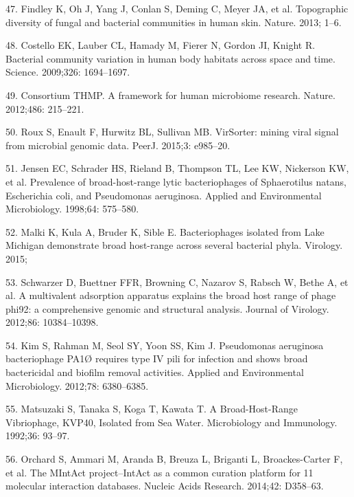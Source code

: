 \documentclass[12pt,]{article}
\begin{document}
\hypertarget{ref-Findley:2013jf}{}
47. Findley K, Oh J, Yang J, Conlan S, Deming C, Meyer JA, et al.
Topographic diversity of fungal and bacterial communities in human skin.
Nature. 2013; 1--6.

\hypertarget{ref-Costello:2009im}{}
48. Costello EK, Lauber CL, Hamady M, Fierer N, Gordon JI, Knight R.
Bacterial community variation in human body habitats across space and
time. Science. 2009;326: 1694--1697.

\hypertarget{ref-Consortium:2012iz}{}
49. Consortium THMP. A framework for human microbiome research. Nature.
2012;486: 215--221.

\hypertarget{ref-Roux:2015dh}{}
50. Roux S, Enault F, Hurwitz BL, Sullivan MB. VirSorter: mining viral
signal from microbial genomic data. PeerJ. 2015;3: e985--20.

\hypertarget{ref-Jensen:1998vh}{}
51. Jensen EC, Schrader HS, Rieland B, Thompson TL, Lee KW, Nickerson
KW, et al. Prevalence of broad-host-range lytic bacteriophages of
Sphaerotilus natans, Escherichia coli, and Pseudomonas aeruginosa.
Applied and Environmental Microbiology. 1998;64: 575--580.

\hypertarget{ref-Malki:2015tm}{}
52. Malki K, Kula A, Bruder K, Sible E. Bacteriophages isolated from
Lake Michigan demonstrate broad host-range across several bacterial
phyla. Virology. 2015;

\hypertarget{ref-Schwarzer:2012ez}{}
53. Schwarzer D, Buettner FFR, Browning C, Nazarov S, Rabsch W, Bethe A,
et al. A multivalent adsorption apparatus explains the broad host range
of phage phi92: a comprehensive genomic and structural analysis. Journal
of Virology. 2012;86: 10384--10398.

\hypertarget{ref-Kim:2012dh}{}
54. Kim S, Rahman M, Seol SY, Yoon SS, Kim J. Pseudomonas aeruginosa
bacteriophage PA1Ø requires type IV pili for infection and shows broad
bactericidal and biofilm removal activities. Applied and Environmental
Microbiology. 2012;78: 6380--6385.

\hypertarget{ref-Matsuzaki:1992gw}{}
55. Matsuzaki S, Tanaka S, Koga T, Kawata T. A Broad-Host-Range
Vibriophage, KVP40, Isolated from Sea Water. Microbiology and
Immunology. 1992;36: 93--97.

\hypertarget{ref-Orchard:2014hq}{}
56. Orchard S, Ammari M, Aranda B, Breuza L, Briganti L, Broackes-Carter
F, et al. The MIntAct project--IntAct as a common curation platform for
11 molecular interaction databases. Nucleic Acids Research. 2014;42:
D358--63.
\end{document}
